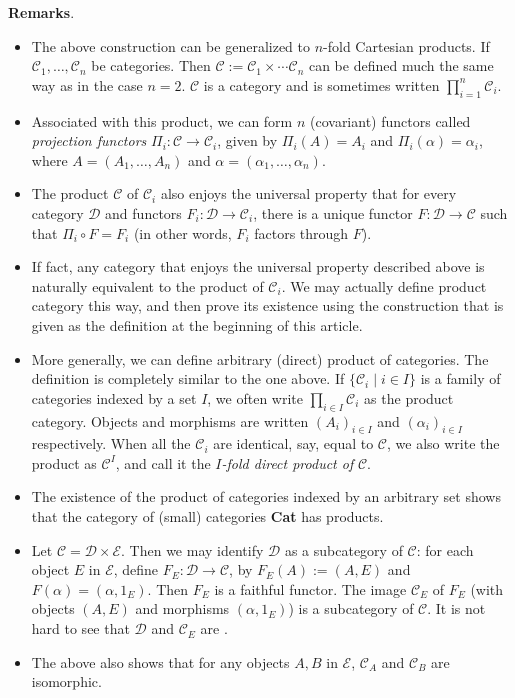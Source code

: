 \documentclass[12pt]{article}
\begin{document}
\textbf{Remarks}.
\begin{itemize}
\item
The above construction can be generalized to $n$-fold Cartesian products.  If $\mathcal{C}_1,\ldots,\mathcal{C}_n$ be categories.  Then $\mathcal{C}:=\mathcal{C}_1\times\cdots \mathcal{C}_n$ can be defined much the same way as in the case $n=2$.  $\mathcal{C}$ is a category and is sometimes written $\prod_{i=1}^n \mathcal{C}_i$.
\item
Associated with this product, we can form $n$ (covariant) functors called \emph{projection functors} $\Pi_i:\mathcal{C}\to \mathcal{C}_i$, given by $\Pi_i(A)=A_i$ and $\Pi_i(\alpha)=\alpha_i$, where $A=(A_1,\ldots,A_n)$ and $\alpha=(\alpha_1,\ldots,\alpha_n)$.
\item
The product $\mathcal{C}$ of $\mathcal{C}_i$ also enjoys the universal property that for every category $\mathcal{D}$ and functors $F_i: \mathcal{D}\to \mathcal{C}_i$, there is a unique functor $F:\mathcal{D}\to \mathcal{C}$ such that $\Pi_i\circ F=F_i$ (in other words, $F_i$ factors through $F$).
\item 
If fact, any category that enjoys the universal property described above is naturally equivalent to the product of $\mathcal{C}_i$.  We may actually define product category this way, and then prove its existence using the construction that is given as the definition at the beginning of this article.
\item
More generally, we can define arbitrary (direct) product of categories.  The definition is completely similar to the one above.  If $\lbrace \mathcal{C}_i\mid i\in I\rbrace$ is a family of categories indexed by a set $I$, we often write $\prod_{i\in I} \mathcal{C}_i$ as the product category.  Objects and morphisms are written $(A_i)_{i\in I}$ and $(\alpha_i)_{i\in I}$ respectively.  When all the $\mathcal{C}_i$ are identical, say, equal to $\mathcal{C}$, we also write the product as $\mathcal{C}^I$, and call it the \emph{$I$-fold direct product of} $\mathcal{C}$.
\item The existence of the product of categories indexed by an arbitrary set shows that the category of (small) categories \textbf{Cat} has products.
\item 
Let $\mathcal{C}=\mathcal{D}\times\mathcal{E}$.  Then we may identify $\mathcal{D}$ as a subcategory of $\mathcal{C}$: for each object $E$ in $\mathcal{E}$, define $F_E:\mathcal{D}\to\mathcal{C}$, by $F_E(A):=(A,E)$ and $F(\alpha)=(\alpha,1_E)$.  Then $F_E$ is a faithful functor.  The image $\mathcal{C}_E$ of $F_E$ (with objects $(A,E)$ and morphisms $(\alpha,1_E)$) is a subcategory of $\mathcal{C}$.  It is not hard to see that $\mathcal{D}$ and $\mathcal{C}_E$ are .
\item 
The above also shows that for any objects $A,B$ in $\mathcal{E}$, $\mathcal{C}_A$ and $\mathcal{C}_B$ are isomorphic.
\end{itemize}
\end{document}
